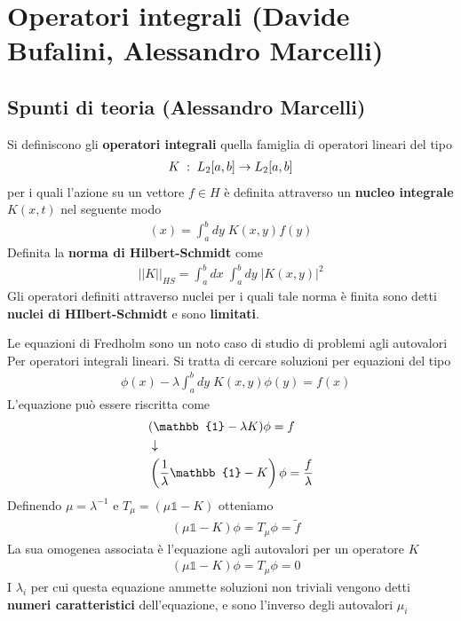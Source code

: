 \section{Operatori integrali (Davide Bufalini, Alessandro Marcelli)}

\subsection{Spunti di teoria (Alessandro Marcelli)}

Si definiscono gli \textbf{operatori integrali} quella famiglia di operatori lineari del tipo
\begin{align}
	K \; : \; L_2 [a,b] \rightarrow L_2 [a,b] 
\end{align}
per i quali l'azione su un vettore $f \in H$ è definita attraverso un \textbf{nucleo integrale} $K(x,t)$ nel seguente modo
\begin{align}
	[Kf](x) =  \int_{a}^{b} dy \; K(x,y) f(y)  
\end{align}
Definita la \textbf{norma di Hilbert-Schmidt} come
\begin{align}
	||K||_{HS} =\int_{a}^{b} dx \; \int_{a}^{b} dy \; |K(x,y)|^2
\end{align}
Gli operatori definiti attraverso nuclei per i quali tale norma è finita sono detti \textbf{nuclei di HIlbert-Schmidt} e sono \textbf{limitati}.

Le equazioni di Fredholm sono un noto caso di studio di problemi agli autovalori Per operatori integrali lineari. Si tratta di cercare soluzioni per equazioni del tipo
\begin{align}
	&\phi(x) - \lambda \int_{a}^{b} dy \; K(x,y) \phi(y) = f(x) 
\end{align}
L'equazione può essere riscritta come
\begin{align}
	&(\mathbb{1} - \lambda K)\phi=f \nextpassage
	&\left(\frac{1}{\lambda}\mathbb{1} - K \right)\phi=\frac{f}{\lambda}
\end{align}
Definendo $\mu = \lambda^{-1}$ e $T_\mu = (\mu \mathbb{1} - K)$ otteniamo 
\begin{align}
	&\left(\mu\mathbb{1} - K \right)\phi= T_\mu \phi = \tilde{f}
\end{align}
La sua omogenea associata è l'equazione agli autovalori per un operatore $K$
\begin{align}
	&\left(\mu\mathbb{1} - K \right)\phi= T_\mu \phi = 0
\end{align}
I $\lambda_i$ per cui questa equazione ammette soluzioni non triviali vengono detti \textbf{numeri caratteristici} dell'equazione, e sono l'inverso degli autovalori $\mu_i$

